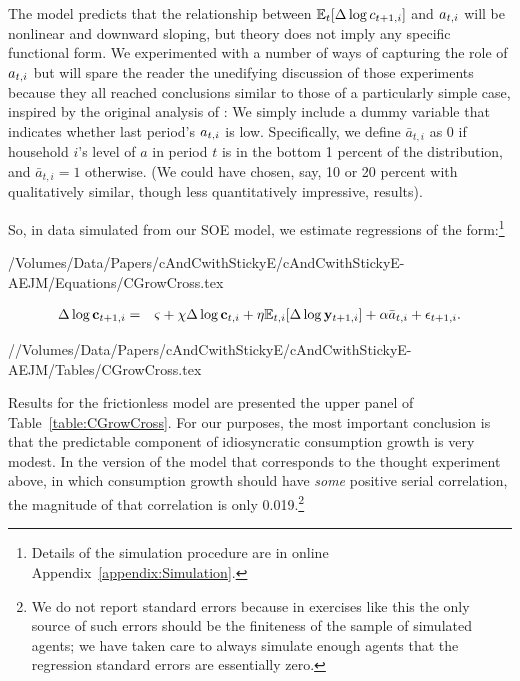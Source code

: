The model predicts that the relationship between $\operatorname{\mathbb{E}}_{t}[\Delta \log c_{t+1,i}]$ and $a_{t,i}$ will be nonlinear and downward sloping, but theory does not imply any specific functional form.  We experimented with a number of ways of capturing the role of $a_{t,i}$ but will spare the reader the unedifying discussion of those experiments because they all reached conclusions similar to those of a particularly simple case, inspired by the original analysis of \cite{zeldes:jpe}: We simply include a dummy variable that indicates whether last period's $a_{t,i}$ is low.  Specifically, we define $\bar{a}_{t,i}$ as 0 if household $i$'s level of ${a}$ in period $t$ is in the bottom 1 percent of the distribution, and $\bar{a}_{t,i}=1$ otherwise.  (We could have chosen, say, 10 or 20 percent with qualitatively similar, though less quantitatively impressive, results).

So, in data simulated from our SOE model, we estimate regressions of the form:\footnote{Details of the simulation procedure are in online Appendix~\ref{appendix:Simulation}.}
\begin{verbatimwrite}{/Volumes/Data/Papers/cAndCwithStickyE/cAndCwithStickyE-AEJM/Equations/CGrowCross.tex}
   \newcommand{\CGrowCross}{\Delta \log       \cLevBF _{t+1,i}  &=&  \varsigma + \chi \Delta \log      \cLevBF _{t,i} + \eta     {\Ex}_{t,i}[\Delta \log       \yLevBF _{t+1,i}]+ {\alpha} \bar{a}_{t,i}+\epsilon_{t+1,i}.}
\newcommand{\CGrowCrossBar}{\Delta \log  \perc{\cLevBF}_{t+1,i}  &=&  \varsigma + \chi \Delta \log \perc{\cLevBF}_{t,i} + \eta     {\Ex}_{t,i}[\Delta \log \perc{\yLevBF}_{t+1,i}] + {\alpha} {\perc{a}}_{t,i}+\epsilon_{t+1,i}.}
\end{verbatimwrite}

\begin{eqnarray*}
\CGrowCross
\end{eqnarray*}

//Volumes/Data/Papers/cAndCwithStickyE/cAndCwithStickyE-AEJM/Tables/CGrowCross.tex

Results for the frictionless model are presented the upper panel of Table~\ref{table:CGrowCross}.
For our purposes, the most important conclusion is that the predictable component of idiosyncratic consumption growth is very modest.  In the version of the model that corresponds to the thought experiment above, in which consumption growth should have {\it some} positive serial correlation, the magnitude of that correlation is only 0.019.\footnote{We do not report standard errors because in exercises like this the only source of such errors should be the finiteness of the sample of simulated agents; we have taken care to always simulate enough agents that the regression standard errors are essentially zero.}

